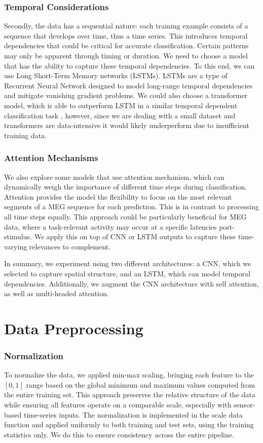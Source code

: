 \documentclass[conference]{IEEEtran}
\begin{document}
\subsubsection{Temporal Considerations}
Secondly, the data has a sequential nature: each training example consists of a sequence that develops over time, thus a time series. This introduces temporal dependencies that could be critical for accurate classification. Certain patterns may only be apparent through timing or duration. We need to choose a model that has the ability to capture these temporal dependencies. To this end, we can use Long Short-Term Memory networks (LSTMs). LSTMs are a type of Recurrent Neural Network designed to model long-range temporal dependencies and mitigate vanishing gradient problems. We could also choose a transformer model, which is able to outperform LSTM in a similar temporal dependent classification task \cite{ali2024comprehensive}, however, since we are dealing with a small dataset and transformers are data-intensive it would likely underperform due to insufficient training data. 

\subsubsection{Attention Mechanisms}
We also explore some models that use attention mechanism, which can dynamically weigh the importance of different time steps during classification. Attention provides the model the flexibility to focus on the most relevant segments of a MEG sequence for each prediction. This is in contrast to processing all time steps equally. This approach could be particularly beneficial for MEG data, where a task-relevant activity may occur at a specific latencies post-stimulus. We apply this on top of CNN or LSTM outputs to capture these time-varying relevances to complement.

In summary, we experiment using two different architectures: a CNN, which we selected to capture spatial structure, and an LSTM, which can model temporal dependencies. Additionally, we augment the CNN architecture with self attention, as well as multi-headed attention.

\section{Data Preprocessing}
\subsubsection{Normalization}
To normalize the data, we applied min-max scaling, bringing each feature to the $[0,1]$ range based on the global minimum and maximum values computed from the entire training set.
 This approach preserves the relative structure of the data while ensuring all features operate on a comparable scale, especially with sensor-based time-series inputs.
The normalization is implemented in the scale data function and applied uniformly to both training and test sets, using the training statistics only. We do this to ensure consistency across the entire pipeline.
\end{document}
